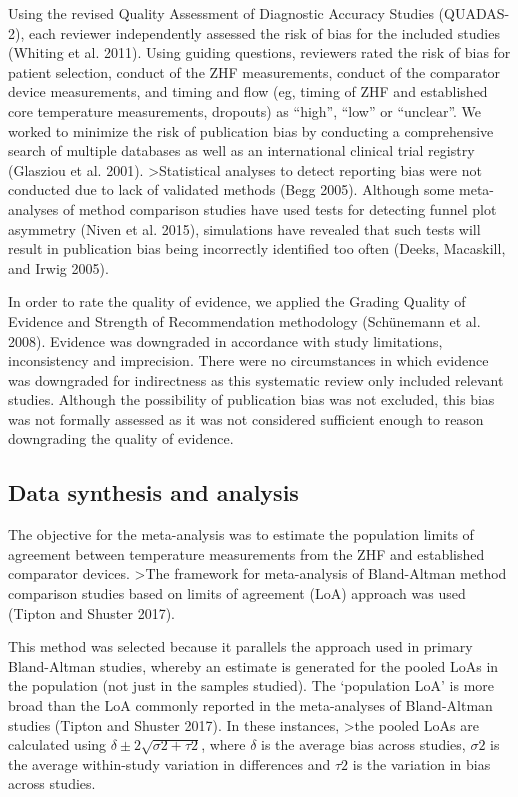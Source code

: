 \documentclass[smallextended]{svjour3}       %
\begin{document}
Using the revised Quality Assessment of Diagnostic Accuracy Studies
(QUADAS-2), each reviewer independently assessed the risk of bias for
the included studies (Whiting et al. 2011). Using guiding questions,
reviewers rated the risk of bias for patient selection, conduct of the
ZHF measurements, conduct of the comparator device measurements, and
timing and flow (eg, timing of ZHF and established core temperature
measurements, dropouts) as ``high'', ``low'' or ``unclear''. We worked
to minimize the risk of publication bias by conducting a comprehensive
search of multiple databases as well as an international clinical trial
registry (Glasziou et al. 2001). \textgreater{}Statistical analyses to
detect reporting bias were not conducted due to lack of validated
methods (Begg 2005). Although some meta-analyses of method comparison
studies have used tests for detecting funnel plot asymmetry (Niven et
al. 2015), simulations have revealed that such tests will result in
publication bias being incorrectly identified too often (Deeks,
Macaskill, and Irwig 2005).

In order to rate the quality of evidence, we applied the Grading Quality
of Evidence and Strength of Recommendation methodology (Schünemann et
al. 2008). Evidence was downgraded in accordance with study limitations,
inconsistency and imprecision. There were no circumstances in which
evidence was downgraded for indirectness as this systematic review only
included relevant studies. Although the possibility of publication bias
was not excluded, this bias was not formally assessed as it was not
considered sufficient enough to reason downgrading the quality of
evidence.

\hypertarget{data-synthesis-and-analysis}{%
\subsection{Data synthesis and
analysis}\label{data-synthesis-and-analysis}}

The objective for the meta-analysis was to estimate the population
limits of agreement between temperature measurements from the ZHF and
established comparator devices. \textgreater{}The framework for
meta-analysis of Bland-Altman method comparison studies based on limits
of agreement (LoA) approach was used (Tipton and Shuster 2017).

This method was selected because it parallels the approach used in
primary Bland-Altman studies, whereby an estimate is generated for the
pooled LoAs in the population (not just in the samples studied). The
`population LoA' is more broad than the LoA commonly reported in the
meta-analyses of Bland-Altman studies (Tipton and Shuster 2017). In
these instances, \textgreater{}the pooled LoAs are calculated using
\(\delta\pm2\sqrt{\sigma2+\tau2}\), where \(\delta\) is the average bias
across studies, \(\sigma2\) is the average within-study variation in
differences and \(\tau2\) is the variation in bias across studies.
\end{document}
